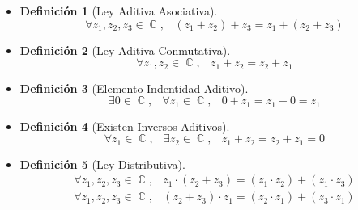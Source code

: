 \documentclass[12pt, fleqn]{report}                             %
\DeclareMathOperator \Space {\quad}                             %
\DeclareMathOperator \MiniSpace {\;}                            %
\newtheorem{Definition}{Definición}[section]                    %
\newenvironment{MultiLineEquation}[1]                           %
        {\begin{equation}\begin{alignedat}{#1}}                     %
        {\end{alignedat}\end{equation}}                             %
\DeclareMathOperator \Complexs  {\mathbb{C}}                     %
\begin{document}
            \begin{itemize}
                    
                \item 
                    \begin{Definition}[Ley Aditiva Asociativa]
                        \begin{equation}
                            \forall z_1, z_2, z_3 \in \Complexs, \MiniSpace
                                (z_1 + z_2) + z_3 = z_1 + (z_2 + z_3)
                        \end{equation}
                    \end{Definition}

                \item
                    \begin{Definition}[Ley Aditiva Conmutativa]
                        \begin{equation}
                            \forall z_1, z_2 \in \Complexs, \MiniSpace z_1 + z_2 =  z_2 + z_1
                        \end{equation}
                    \end{Definition}

                \item
                    \begin{Definition}[Elemento Indentidad Aditivo]
                        \begin{equation}
                            \exists 0 \in \Complexs, \MiniSpace
                                \forall z_1 \in \Complexs, \MiniSpace 0 + z_1 = z_1  + 0 = z_1
                        \end{equation}
                    \end{Definition}


                \item
                    \begin{Definition}[Existen Inversos Aditivos]
                        \begin{equation}
                            \forall z_1 \in \Complexs, \MiniSpace
                                \exists z_2 \in \Complexs, \MiniSpace
                                    z_1  + z_2 = z_2 + z_1 = 0
                        \end{equation}
                    \end{Definition}

                \item
                    \begin{Definition}[Ley Distributiva]
                        \begin{MultiLineEquation}{1}
                            \forall z_1, z_2, z_3 \in \Complexs, \MiniSpace
                                z_1 \cdot (z_2  + z_3) = (z_1  \cdot z_2) + (z_1  \cdot z_3)        \\
                            \forall z_1, z_2, z_3 \in \Complexs, \MiniSpace
                                (z_2 + z_3) \cdot z_1  = (z_2 \cdot z_1) + (z_3  \cdot z_1)
                        \end{MultiLineEquation}
                    \end{Definition}



\end{itemize}
\end{document}
